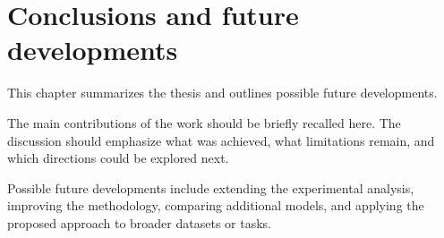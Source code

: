 \chapter{Conclusions and future developments}
\label{ch:conclusions}

This chapter summarizes the thesis and outlines possible future developments.

The main contributions of the work should be briefly recalled here. The discussion should emphasize what was achieved, what limitations remain, and which directions could be explored next.

Possible future developments include extending the experimental analysis, improving the methodology, comparing additional models, and applying the proposed approach to broader datasets or tasks.